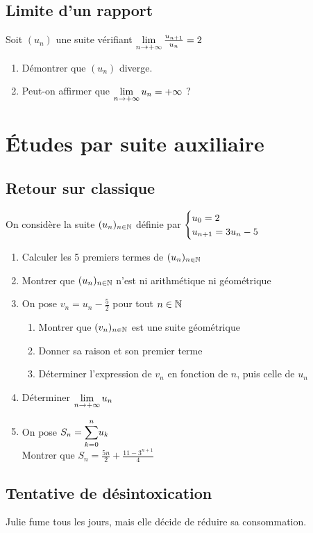 \documentclass[oneside,12pt]{book}          %
\begin{document}
\subsection{Limite d'un rapport}
Soit $(u_n)$ une suite vérifiant ${\lim\limits_{n\to +\infty}}\,\frac{u_{n+1}}{u_n}=2$
\begin{enumerate}
	\item Démontrer que $(u_n)$ diverge.
	\item Peut-on affirmer que ${\lim\limits_{n\to +\infty}}\, u_n=+\infty$ ?
\end{enumerate}



\section{Études par suite auxiliaire}

\subsection{Retour sur classique}
On considère la suite ${(u_{n})_{n\in\mathbb N}}$ définie par $\defsuite{u_0=2}{3u_n-5}$
\begin{enumerate}
    \item Calculer les 5 premiers termes de ${(u_{n})_{n\in\mathbb N}}$
    \item Montrer que ${(u_{n})_{n\in\mathbb N}}$ n'est ni arithmétique ni géométrique
    \item On pose $v_n=u_n-\frac{5}{2}$ pour tout ${n\in\mathbb N}$
    \begin{enumerate}
        \item Montrer que $(v_n)_{{n\in\mathbb N}}$ est une suite géométrique
        \item Donner sa raison et son premier terme
        \item Déterminer l'expression de $v_n$ en fonction de $n$, puis celle de $u_n$
    \end{enumerate}
    \item Déterminer ${\lim\limits_{n\to +\infty}}\, u_n$
    \item On pose $S_n={\displaystyle\sum_{k=0}^{n}}u_k$\\
		Montrer que $S_n=\frac{5n}{2}+\frac{11-3^{n+1}}{4}$

\end{enumerate}



\subsection{Tentative de désintoxication}
Julie fume tous les jours, mais elle décide de réduire sa consommation.
\end{document}
